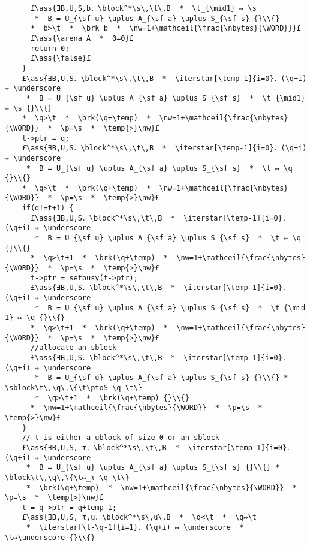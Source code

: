\documentclass[12pt,a4paper]{article}
\makeatletter
\newcommand{\ml}[2][t]{\mbox{\mdseries\begin{tabular}[#1]{@{}L@{}}#2\end{tabular}}}
\newcommand{\ass}[1]{\ensuremath{{\color{blue}\left\{\ml[c]{#1}\right\}}}}
\newcommand{\iterstar}[2][]{\text{\LARGE $*$}^{#1}_{#2}}
\makeatother
\begin{document}
\begin{lstlisting}
      £\ass{∃B,U,S,b．\block^*\s\,\t\,B  *  \t_{\mid1} ↦ \s 
       *  B = U_{\sf u} \uplus A_{\sf a} \uplus S_{\sf s} {}\\{}
      *  b>\t  *  \brk b  *  \nw=1+\mathceil{\frac{\nbytes}{\WORD}}}£
      £\ass{\arena A  *  0=0}£
      return 0;
      £\ass{\false}£
    }
    £\ass{∃B,U,S．\block^*\s\,\t\,B  *  \iterstar[\temp-1]{i=0}．(\q+i) ↦ \underscore 
     *  B = U_{\sf u} \uplus A_{\sf a} \uplus S_{\sf s}  *  \t_{\mid1} ↦ \s {}\\{}
    *  \q>\t  *  \brk(\q+\temp)  *  \nw=1+\mathceil{\frac{\nbytes}{\WORD}}  *  \p=\s  *  \temp{>}\nw}£
    t->ptr = q;
    £\ass{∃B,U,S．\block^*\s\,\t\,B  *  \iterstar[\temp-1]{i=0}．(\q+i) ↦ \underscore 
     *  B = U_{\sf u} \uplus A_{\sf a} \uplus S_{\sf s}  *  \t ↦ \q {}\\{}
    *  \q>\t  *  \brk(\q+\temp)  *  \nw=1+\mathceil{\frac{\nbytes}{\WORD}}  *  \p=\s  *  \temp{>}\nw}£
    if(q!=t+1) {
      £\ass{∃B,U,S．\block^*\s\,\t\,B  *  \iterstar[\temp-1]{i=0}．(\q+i) ↦ \underscore 
       *  B = U_{\sf u} \uplus A_{\sf a} \uplus S_{\sf s}  *  \t ↦ \q {}\\{}
      *  \q>\t+1  *  \brk(\q+\temp)  *  \nw=1+\mathceil{\frac{\nbytes}{\WORD}}  *  \p=\s  *  \temp{>}\nw}£
      t->ptr = setbusy(t->ptr);
      £\ass{∃B,U,S．\block^*\s\,\t\,B  *  \iterstar[\temp-1]{i=0}．(\q+i) ↦ \underscore 
       *  B = U_{\sf u} \uplus A_{\sf a} \uplus S_{\sf s}  *  \t_{\mid 1} ↦ \q {}\\{}
      *  \q>\t+1  *  \brk(\q+\temp)  *  \nw=1+\mathceil{\frac{\nbytes}{\WORD}}  *  \p=\s  *  \temp{>}\nw}£
      //allocate an sblock
      £\ass{∃B,U,S．\block^*\s\,\t\,B  *  \iterstar[\temp-1]{i=0}．(\q+i) ↦ \underscore 
       *  B = U_{\sf u} \uplus A_{\sf a} \uplus S_{\sf s} {}\\{} *  \sblock\t\,\q\,\{\t\ptoS \q-\t\} 
       *  \q>\t+1  *  \brk(\q+\temp) {}\\{}
      *  \nw=1+\mathceil{\frac{\nbytes}{\WORD}}  *  \p=\s  *  \temp{>}\nw}£
    }
    // t is either a ublock of size 0 or an sblock
    £\ass{∃B,U,S, τ．\block^*\s\,\t\,B  *  \iterstar[\temp-1]{i=0}．(\q+i) ↦ \underscore 
     *  B = U_{\sf u} \uplus A_{\sf a} \uplus S_{\sf s} {}\\{} *  \block\t\,\q\,\{\t↦_τ \q-\t\} 
     *  \brk(\q+\temp)  *  \nw=1+\mathceil{\frac{\nbytes}{\WORD}}  *  \p=\s  *  \temp{>}\nw}£
    t = q->ptr = q+temp-1;
    £\ass{∃B,U,S, τ,u．\block^*\s\,u\,B  *  \q<\t  *  \q↦\t 
     *  \iterstar[\t-\q-1]{i=1}．(\q+i) ↦ \underscore  *  \t↦\underscore {}\\{} 

\end{lstlisting}
\end{document}
